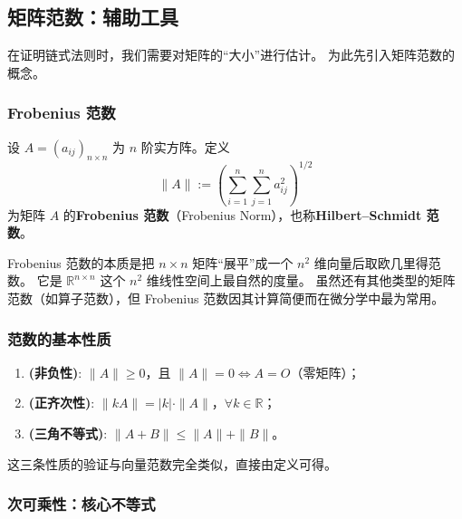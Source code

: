 \documentclass[lang=cn,11pt]{elegantbook}
\begin{document}
\subsection{矩阵范数：辅助工具}

在证明链式法则时，我们需要对矩阵的“大小”进行估计。
为此先引入矩阵范数的概念。

\subsubsection*{Frobenius 范数}

\begin{definition} \label{def:matrix-norm}
设 $A=(a_{ij})_{n\times n}$ 为 $n$ 阶实方阵。定义
\[
\boxed{\;\|A\|:=\left(\sum_{i=1}^{n}\sum_{j=1}^{n}a_{ij}^{2}\right)^{\!1/2}\;}
\]
为矩阵 $A$ 的\textbf{Frobenius 范数}（Frobenius Norm），也称\textbf{Hilbert--Schmidt 范数}。
\end{definition}

\begin{note}[直观理解]
Frobenius 范数的本质是把 $n\times n$ 矩阵“展平”成一个 $n^2$ 维向量后取欧几里得范数。
它是 $\mathbb R^{n\times n}$ 这个 $n^2$ 维线性空间上最自然的度量。
虽然还有其他类型的矩阵范数（如算子范数），但 Frobenius 范数因其计算简便而在微分学中最为常用。
\end{note}

\subsubsection*{范数的基本性质}

\begin{property} \label{prop:norm-basic}
\begin{enumerate}
  \item \textbf{(非负性)}: $\|A\|\geq 0$，且 $\|A\|=0\Longleftrightarrow A=O$（零矩阵）；
  \item\textbf{(正齐次性)}: $\|kA\|=|k|\cdot\|A\|$，$\forall k\in\mathbb R$；
  \item\textbf{(三角不等式)}: $\|A+B\|\leq\|A\|+\|B\|$。
\end{enumerate}
\end{property}

这三条性质的验证与向量范数完全类似，直接由定义可得。

\subsubsection*{次可乘性：核心不等式}
\end{document}
